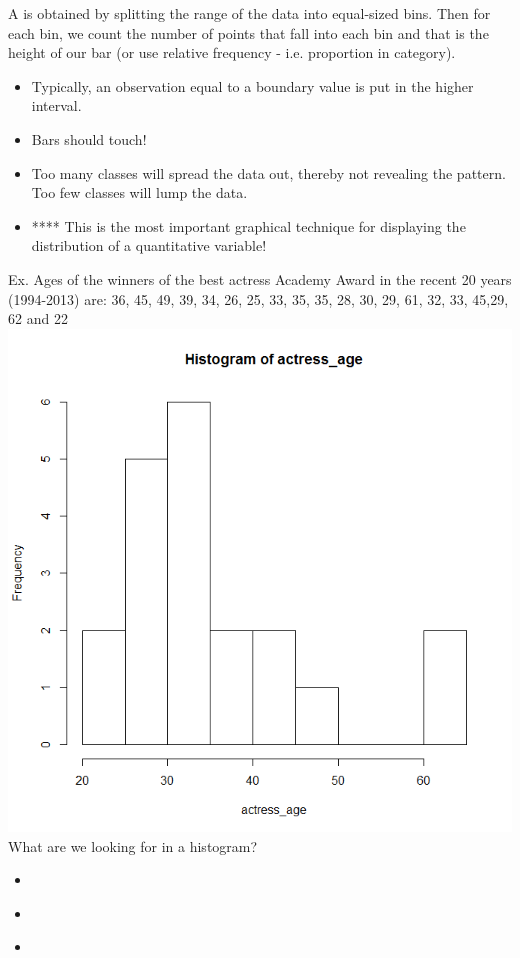 A \underbar{~~~~~~~~~~~~~~~~~~~~~~~~~~~~~~~~~~~~} is obtained by splitting the range of the data into equal-sized bins. Then for each bin, we count the number of points that fall into each bin and that is the height of our bar (or use relative frequency - i.e. proportion in category).  
\begin{itemize}
\item Typically, an observation equal to a boundary value is put in the higher interval.
\item Bars should touch!
\item Too many classes will spread the data out, thereby not revealing the pattern.  Too few classes will lump the data.  
\item **** This is the most important graphical technique for displaying the distribution of a quantitative variable!
\end{itemize}
Ex. Ages of the winners of the best actress Academy Award in the recent 20 years (1994-2013) are: 36, 45, 49, 39, 34, 26, 25, 33, 35, 35, 28, 30, 29, 61, 32, 33, 45,29, 62 and 22\\
\includegraphics[scale=0.3]{oscarhist}\\

What are we looking for in a histogram?\\
\begin{itemize}
\item ~\\
\item ~\\
\item ~
\end{itemize}
\newpage

